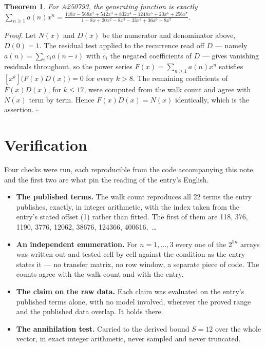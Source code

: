 \documentclass[11pt]{article}
\newtheorem{theorem}{Theorem}
\theoremstyle{definition}
\begin{document}
\begin{theorem} For A250793, the generating function is exactly $\sum_{n\ge 1} a(n)x^n = \frac{118x - 568x^{2} + 542x^{3} + 832x^{4} - 1248x^{5} + 20x^{6} + 256x^{7}}{1 - 8x + 20x^{2} - 8x^{3} - 33x^{4} + 36x^{5} - 8x^{7}}$.\end{theorem}

{\itshape Proof.} Let $N(x)$ and $D(x)$ be the numerator and denominator above, $D(0)=1$. The residual test applied to the recurrence read off $D$ --- namely $a(n) = \sum_i c_i a(n-i)$ with $c_i$ the negated coefficients of $D$ --- gives vanishing residuals throughout, so the power series $F(x)=\sum_{n\ge 1}a(n)x^n$ satisfies $[x^k]\bigl(F(x)D(x)\bigr) = 0$ for every $k > 8$. The remaining coefficients of $F(x)D(x)$, for $k \le 17$, were computed from the walk count and agree with $N(x)$ term by term. Hence $F(x)D(x) = N(x)$ identically, which is the assertion. $\square$

\section{Verification}

Four checks were run, each reproducible from the code accompanying this note, and the first two are what pin the reading of the entry's English.

\begin{itemize}

\item {\bfseries The published terms.} The walk count reproduces all 22 terms the entry publishes, exactly, in integer arithmetic, with the index taken from the entry's stated offset (1) rather than fitted. The first of them are 118, 376, 1190, 3776, 12062, 38676, 124366, 400616,~\dots

\item {\bfseries An independent enumeration.} For $n = 1,\dots,3$ every one of the $2^{5n}$ arrays was written out and tested cell by cell against the condition as the entry states it --- no transfer matrix, no row window, a separate piece of code. The counts agree with the walk count and with the entry.

\item {\bfseries The claim on the raw data.} Each claim was evaluated on the entry's published terms alone, with no model involved, wherever the proved range and the published data overlap. It holds there.

\item {\bfseries The annihilation test.} Carried to the derived bound $S = 12$ over the whole vector, in exact integer arithmetic, never sampled and never truncated.

\end{itemize}
\end{document}
